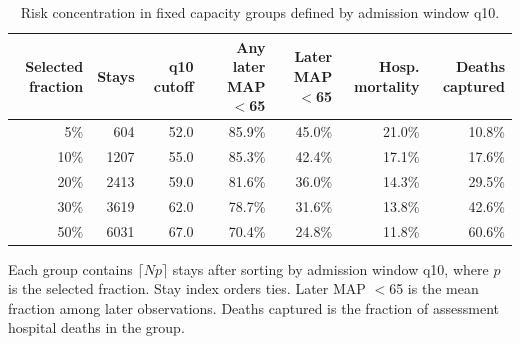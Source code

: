 \begin{table}[!htbp]
\caption{Risk concentration in fixed capacity groups defined by admission window q10.}
\label{tab:clinical_yield_thresholds}
\centering
\begin{tabular}{rrrrrrr}
\hline
Selected fraction & Stays & q10 cutoff & Any later MAP $<$65 & Later MAP $<$65 & Hosp. mortality & Deaths captured\\
\hline
5\% & 604 & 52.0 & 85.9\% & 45.0\% & 21.0\% & 10.8\%\\
10\% & 1207 & 55.0 & 85.3\% & 42.4\% & 17.1\% & 17.6\%\\
20\% & 2413 & 59.0 & 81.6\% & 36.0\% & 14.3\% & 29.5\%\\
30\% & 3619 & 62.0 & 78.7\% & 31.6\% & 13.8\% & 42.6\%\\
50\% & 6031 & 67.0 & 70.4\% & 24.8\% & 11.8\% & 60.6\%\\
\hline
\end{tabular}
\par\smallskip
\footnotesize{Each group contains $\lceil Np\rceil$ stays after sorting by admission window q10, where $p$ is the selected fraction. Stay index orders ties. Later MAP $<$65 is the mean fraction among later observations. Deaths captured is the fraction of assessment hospital deaths in the group.}
\end{table}
